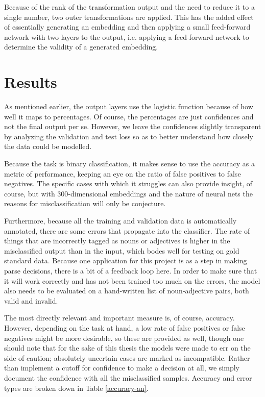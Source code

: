 \documentclass[a4paper, 12pt]{article}
\begin{document}
Because of the rank of the transformation output and the need to reduce it to a single number, two outer transformations are applied. This has the added effect of essentially generating an embedding and then applying a small feed-forward network with two layers to the output, i.e. applying a feed-forward network to determine the validity of a generated embedding.


\section{Results}

As mentioned earlier, the output layers use the logistic function because of how well it maps to percentages. Of course, the percentages are just confidences and not the final output per se. However, we leave the confidences slightly transparent by analyzing the validation and test loss so as to better understand how closely the data could be modelled.

Because the task is binary classification, it makes sense to use the accuracy as a metric of performance, keeping an eye on the ratio of false positives to false negatives. The specific cases with which it struggles can also provide insight, of course, but with 300-dimensional embeddings and the nature of neural nets the reasons for misclassification will only be conjecture.

Furthermore, because all the training and validation data is automatically annotated, there are some errors that propagate into the classifier. The rate of things that are incorrectly tagged as nouns or adjectives is higher in the misclassified output than in the input, which bodes well for testing on gold standard data. Because one application for this project is as a step in making parse decisions, there is a bit of a feedback loop here. In order to make sure that it will work correctly and has not been trained too much on the errors, the model also needs to be evaluated on a hand-written list of noun-adjective pairs, both valid and invalid.

The most directly relevant and important measure is, of course, accuracy. However, depending on the task at hand, a low rate of false positives or false negatives might be more desirable, so these are provided as well, though one should note that for the sake of this thesis the models were made to err on the side of caution; absolutely uncertain cases are marked as incompatible. Rather than implement a cutoff for confidence to make a decision at all, we simply document the confidence with all the misclassified samples. Accuracy and error types are broken down in Table \ref{accuracy-an}.
\end{document}
